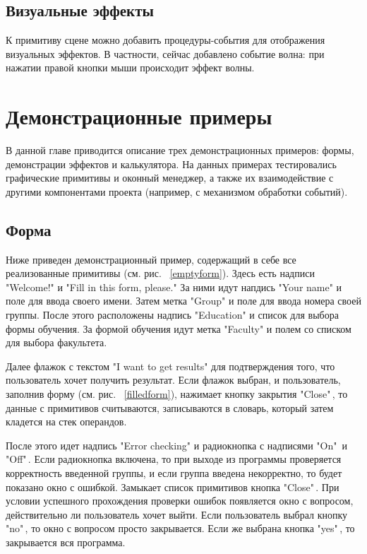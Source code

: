 \documentclass[14pt]{extarticle}
\begin{document}
	\subsection{Визуальные эффекты}
	К примитиву сцене можно добавить процедуры-события для отображения визуальных эффектов. В частности, сейчас добавлено событие волна: при нажатии правой кнопки мыши происходит эффект волны. 
	\pagebreak
	\section{Демонстрационные примеры}
	
	В данной главе приводится описание трех демонстрационных примеров: формы, демонстрации эффектов и калькулятора. На данных примерах тестировались графические примитивы и оконный менеджер, а также их взаимодействие с другими компонентами проекта (например, с механизмом обработки событий).	
	\subsection{Форма}
	
	Ниже приведен демонстрационный пример, содержащий в себе все  реализованные примитивы (см. рис. ~\ref{emptyform}).
	Здесь есть надписи "Welcome!" и "Fill in this form, please."
	За ними идут напдись "Your name" и поле для ввода своего имени.
	Затем метка "Group" и поле для ввода номера своей группы. 
	После этого расположены надпись "Education" и список для выбора формы обучения.
	За формой обучения идут метка "Faculty" и полем со списком для выбора факультета.
	
	Далее флажок с текстом "I want to get results" для подтверждения того, что пользователь хочет получить результат. Если флажок выбран, и  пользователь, заполнив форму (см. рис. ~\ref{filledform}), нажимает кнопку закрытия "Close"\,, то данные с примитивов считываются, записываются в словарь, который затем кладется на стек операндов.
	
	После этого идет надпись "Error checking" и радиокнопка с надписями "On"\, и "Off"\,. Если радиокнопка включена, то при выходе из программы проверяется корректность введенной группы, и если группа введена некорректно, то будет показано окно с ошибкой.	
	Замыкает список примитивов кнопка "Close"\,. При условии успешного прохождения проверки ошибок появляется окно с вопросом, действительно ли пользователь хочет выйти. Если пользователь выбрал кнопку "no"\,, то окно с вопросом просто закрывается. Если же выбрана кнопка "yes"\,, то закрывается вся программа.
	
\end{document}

